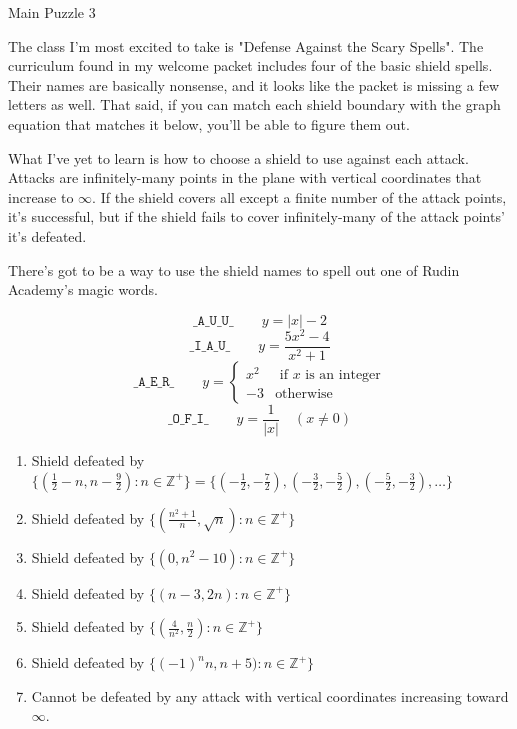 \documentclass{article}
\newcommand{\clue}[1]{#1}
\begin{document}
\newpage


\clue{
Main Puzzle 3

The class I'm most excited to take is "Defense Against the Scary Spells".
The curriculum found in my welcome packet includes four of the basic
shield spells. Their
names are basically nonsense, and it looks like the packet is missing a few letters as well.
That said, if you can match each shield boundary with the graph equation that matches
it below, you'll be able to figure them out.

What I've yet to learn is how to choose a shield to use against each attack.
Attacks are infinitely-many points in the plane with vertical
coordinates that increase to \(\infty\). If the shield covers all
except a finite number of the attack points, it's successful, but if the shield fails
to cover infinitely-many of the attack points' it's defeated.

There's got to be a way to use the shield names to spell out one of Rudin Academy's
magic words.

\[\texttt{\_A\_U\_U\_}
\hspace{2em} y=|x|-2\]
\[\texttt{\_I\_A\_U\_} \hspace{2em}
y=\frac{5x^2-4}{x^2+1}\]
\[\texttt{\_A\_E\_R\_}\hspace{2em}
  y=\begin{cases}
    x^2 & \text{ if }x\text{ is an integer} \\
    -3 & \text{otherwise}
    \end{cases}
\]
\[\texttt{\_O\_F\_I\_}\hspace{2em}
y=\frac{1}{|x|}\hspace{1em}(x\not=0)\]

\begin{enumerate}[I]
\item Shield defeated by \(\{(\frac{1}{2}-n,n-\frac{9}{2}):n\in\mathbb Z^+\}
  =\{(-\frac{1}{2},-\frac{7}{2}),(-\frac{3}{2},-\frac{5}{2}),(-\frac{5}{2},-\frac{3}{2}),\dots\}\)
\item Shield defeated by \(\{(\frac{n^2+1}{n},\sqrt{n}):n\in\mathbb Z^+\}\)
\item Shield defeated by \(\{(0,n^2-10):n\in\mathbb Z^+\}\)
\item Shield defeated by \(\{(n-3,2n):n\in\mathbb Z^+\}\)
\item Shield defeated by \(\{(\frac{4}{n^2},\frac{n}{2}):n\in\mathbb Z^+\}\)
\item Shield defeated by \(\{(-1)^nn,n+5):n\in\mathbb Z^+\}\)
\item Cannot be defeated by any attack with vertical coordinates increasing
  toward \(\infty\).
\end{enumerate}

}
\end{document}

